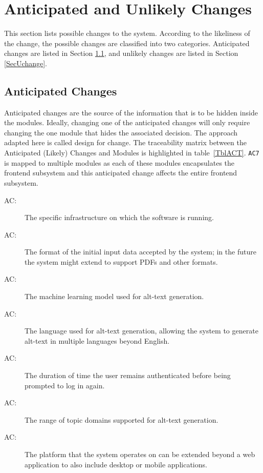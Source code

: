 \documentclass[12pt, titlepage]{article}
\newcounter{acnum}
\newcommand{\actheacnum}{AC\theacnum}
\begin{document}
\section{Anticipated and Unlikely Changes} \label{SecChange}

This section lists possible changes to the system. According to the likeliness
of the change, the possible changes are classified into two
categories. Anticipated changes are listed in Section \ref{SecAchange}, and
unlikely changes are listed in Section \ref{SecUchange}.

\subsection{Anticipated Changes} \label{SecAchange}

Anticipated changes are the source of the information that is to be hidden
inside the modules. Ideally, changing one of the anticipated changes will only
require changing the one module that hides the associated decision. The approach
adapted here is called design for change. The traceability matrix between the Anticipated
(Likely) Changes and Modules is highlighted in table~\ref{TblACT}. \texttt{AC7} is mapped
to multiple modules as each of these modules encapsulates the frontend subsystem and 
this anticipated change affects the entire frontend subsystem. 

\begin{description}

  \item[ \actheacnum \label{acInfra}:] The specific
    infrastructure on which the software is running.
  \item[ \actheacnum \label{acInputFormat}:]
    The format of the
    initial input data accepted by the system; in the future the
    system might extend to support PDFs and other formats.
  \item [ \actheacnum \label{acMLModel}:] The
    machine learning model used for alt-text generation.
  \item [ \actheacnum \label{acLang}:] The
    language used for alt-text generation, allowing the system to
    generate alt-text in multiple languages beyond English.
  \item [ \actheacnum \label{acSession}:] The
    duration of time the user remains authenticated before being
    prompted to log in again.
  \item [ \actheacnum \label{acInputTopic}:]
    The range of topic domains supported for alt-text generation.
  \item [ \actheacnum \label{acPlatform}:] The
    platform that the system operates on can be extended beyond a web
    application to also include desktop or mobile applications.

\end{description}
\end{document}
